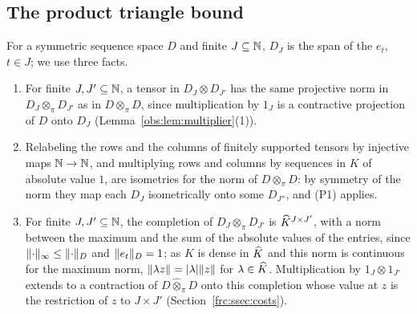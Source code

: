 \subsection{The product triangle bound}\label{frc:ssec:ptb}
For a symmetric sequence space $D$ and finite $J\subseteq\mathbb N$, $D_J$ is the span of the $e_t$, $t\in J$; we use three facts.
\begin{enumerate}
\item[(P1)] For finite $J,J'\subseteq\mathbb N$, a tensor in $D_J\otimes D_{J'}$ has the same projective norm in
$D_J\otimes_\pi D_{J'}$ as in $D\otimes_\pi D$, since multiplication by $1_J$ is a contractive projection of $D$ onto $D_J$
(Lemma~\ref{obs:lem:multiplier}(1)).
\item[(P2)] Relabeling the rows and the columns of finitely supported tensors by injective maps $\mathbb N\to\mathbb N$, and
multiplying rows and columns by sequences in $K$ of absolute value $1$, are isometries for the norm of $D\otimes_\pi D$:
by symmetry of the norm they map each $D_J$ isometrically onto some $D_{J''}$, and (P1) applies.
\item[(P3)] For finite $J,J'\subseteq\mathbb N$, the completion of $D_J\otimes_\pi D_{J'}$ is $\widehat K^{J\times J'}$, with a norm
between the maximum and the sum of the absolute values of the entries, since $\lVert \cdot\rVert_\infty\le\lVert \cdot\rVert_D$ and
$\lVert e_t\rVert_D=1$; as $K$ is dense in $\widehat K$ and this norm is continuous for the maximum norm, $\lVert \lambda z\rVert=\lvert \lambda\rvert\lVert z\rVert$
for $\lambda\in\widehat K$. Multiplication by $1_J\otimes1_{J'}$ extends to a contraction of $D\widehat\otimes_\pi D$ onto this
completion whose value at $z$ is the restriction of $z$ to $J\times J'$ (Section~\ref{frc:ssec:costs}).
\end{enumerate}

